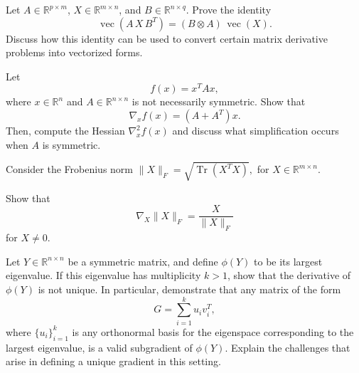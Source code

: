 \begin{exercise}
   Let $A\in\mathbb{R}^{p\times m}$, $X\in\mathbb{R}^{m\times n}$, and $B\in\mathbb{R}^{n\times q}$. Prove the identity
   \[
      \operatorname{vec}(A\,X\,B^T) = (B \otimes A)\,\operatorname{vec}(X).
   \]
   Discuss how this identity can be used to convert certain matrix derivative problems into vectorized forms.
\end{exercise}
\begin{exercise}
   Let 
   \[
      f(x) = x^T A x,
   \]
   where $x\in\mathbb{R}^n$ and $A\in\mathbb{R}^{n\times n}$ is not necessarily symmetric. Show that
   \[
      \nabla_x f(x) = (A + A^T)x.
   \]
   Then, compute the Hessian $\nabla^2_x f(x)$ and discuss what simplification occurs when $A$ is symmetric.
\end{exercise}
\begin{exercise}
   Consider the Frobenius norm
   \(
      \|X\|_F = \sqrt{\operatorname{Tr}(X^T X)},
   \)
   for $X\in\mathbb{R}^{m\times n}$.

   Show that
   \[
      \nabla_X \|X\|_F = \frac{X}{\|X\|_F}
   \]
   for $X\neq 0$.
\end{exercise}
\begin{exercise}
   Let $Y\in\mathbb{R}^{n\times n}$ be a symmetric matrix, and define $\phi(Y)$ to be its largest eigenvalue. If this eigenvalue has multiplicity $k>1$, show that the derivative of $\phi(Y)$ is not unique. In particular, demonstrate that any matrix of the form
   \[
      G = \sum_{i=1}^k u_i v_i^T,
   \]
   where $\{u_i\}_{i=1}^k$ is any orthonormal basis for the eigenspace corresponding to the largest eigenvalue, is a valid subgradient of $\phi(Y)$. Explain the challenges that arise in defining a unique gradient in this setting.
\end{exercise}
